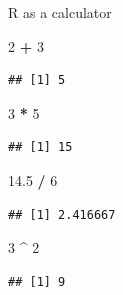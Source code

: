 \documentclass[ignorenonframetext,]{beamer}
\newenvironment{Shaded}{\begin{snugshade}}{\end{snugshade}}
\newcommand{\DecValTok}[1]{\textcolor[rgb]{0.00,0.00,0.81}{#1}}
\newcommand{\FloatTok}[1]{\textcolor[rgb]{0.00,0.00,0.81}{#1}}
\newcommand{\OperatorTok}[1]{\textcolor[rgb]{0.81,0.36,0.00}{\textbf{#1}}}
\newcommand{\StringTok}[1]{\textcolor[rgb]{0.31,0.60,0.02}{#1}}
\begin{document}
\begin{frame}[fragile]{R as a calculator}
\protect\hypertarget{r-as-a-calculator}{}

\begin{Shaded}
\begin{Highlighting}[]
\DecValTok{2} \OperatorTok{+}\StringTok{ }\DecValTok{3} 
\end{Highlighting}
\end{Shaded}

\begin{verbatim}
## [1] 5
\end{verbatim}

\begin{Shaded}
\begin{Highlighting}[]
\DecValTok{3} \OperatorTok{*}\StringTok{ }\DecValTok{5}
\end{Highlighting}
\end{Shaded}

\begin{verbatim}
## [1] 15
\end{verbatim}

\begin{Shaded}
\begin{Highlighting}[]
\FloatTok{14.5} \OperatorTok{/}\StringTok{ }\DecValTok{6}
\end{Highlighting}
\end{Shaded}

\begin{verbatim}
## [1] 2.416667
\end{verbatim}

\begin{Shaded}
\begin{Highlighting}[]
\DecValTok{3} \OperatorTok{^}\StringTok{ }\DecValTok{2}
\end{Highlighting}
\end{Shaded}

\begin{verbatim}
## [1] 9
\end{verbatim}

\end{frame}
\end{document}
